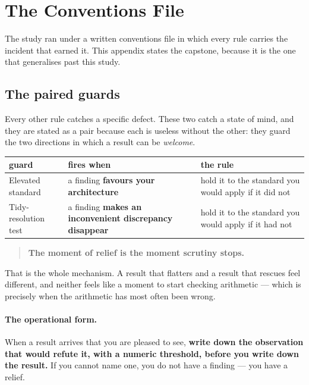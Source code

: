\section{The Conventions File}
\label{app:conventions}

The study ran under a written conventions file in which every rule carries the incident that earned
it. This appendix states the capstone, because it is the one that generalises past this study.

\subsection*{The paired guards}

Every other rule catches a specific defect. These two catch a state of mind, and they are stated as a
pair because each is useless without the other: they guard the two directions in which a result can
be \emph{welcome}.

\begin{center}\small
\begin{tabular}{@{}lp{4.2cm}p{5.4cm}@{}}
\toprule
guard & fires when & the rule \\
\midrule
Elevated standard & a finding \textbf{favours your architecture} & hold it to the standard you would
apply if it did not \\
Tidy-resolution test & a finding \textbf{makes an inconvenient discrepancy disappear} & hold it to
the standard you would apply if it had not \\
\bottomrule
\end{tabular}
\end{center}

\begin{quote}
\textbf{The moment of relief is the moment scrutiny stops.}
\end{quote}

\noindent That is the whole mechanism. A result that flatters and a result that rescues feel
different, and neither feels like a moment to start checking arithmetic --- which is precisely when
the arithmetic has most often been wrong.

\paragraph{The operational form.} When a result arrives that you are pleased to see, \textbf{write
down the observation that would refute it, with a numeric threshold, before you write down the
result.} If you cannot name one, you do not have a finding --- you have a relief.

